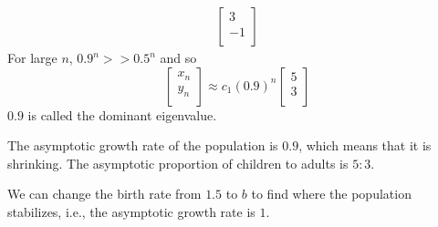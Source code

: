 \documentclass{article}
\begin{document}
\begin{example}
\begin{align*}
\begin{bmatrix}
      3 \\-1\\
    \end{bmatrix}
  \end{align*}
  For large $n$, $0.9^n >> 0.5^n$ and so \[
    \begin{bmatrix}
      x_n \\y_n\\
    \end{bmatrix} \approx c_1(0.9)^n
    \begin{bmatrix}
      5 \\3\\
    \end{bmatrix}
  \]
  $0.9$ is called the dominant eigenvalue.

  The asymptotic growth rate of the population is $0.9$, which means that it is shrinking. The asymptotic proportion of children to adults is $5:3$.

  We can change the birth rate from $1.5$ to $b$ to find where the population stabilizes, i.e., the asymptotic growth rate is $1$.


\end{example}
\end{document}
